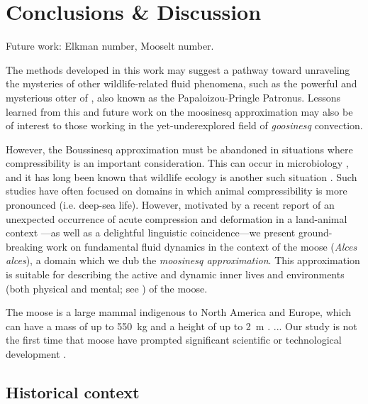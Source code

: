 \section{Conclusions \& Discussion}
\label{sec:conclusions}

Future work: Elkman number, Mooselt number.

The methods developed in this work may suggest a pathway toward
unraveling the mysteries of other wildlife-related fluid phenomena,
such as the powerful and mysterious otter of \cite{Schwab2021}, also
known as the Papaloizou-Pringle Patronus.
Lessons learned from this and future work on the moosinesq approximation may also be of interest to those working in the yet-underexplored field of \textit{goosinesq} convection.


However, the Boussinesq approximation must be abandoned in situations where compressibility is an important consideration.
This can occur in microbiology \citep{Ravetto2014}, and it has long been known that wildlife ecology is another such situation \citep[e.g.][]{Enright1963}.
Such studies have often focused on domains in which animal compressibility is more pronounced (i.e. deep-sea life).
However, motivated by a recent report of an unexpected occurrence of acute compression and deformation in a land-animal context \citep{Gudmannsson2018}---as well as a delightful linguistic coincidence---we present ground-breaking work on fundamental fluid dynamics in the context of the moose (\textit{Alces alces}), a domain which we dub the \textit{moosinesq approximation}.
This approximation is suitable for describing the active and dynamic inner lives and environments (both physical and mental; see \citealp{Gibson2015}) of the moose.

The moose is a large mammal indigenous to North America and Europe, which can have a mass of up to 550~kg and a height of up to 2~m \citep{CPWmoose}.
...
Our study is not the first time that moose have prompted significant scientific or technological development \citep[see, e.g.,][]{Handel2009}.

\subsection{Historical context}

